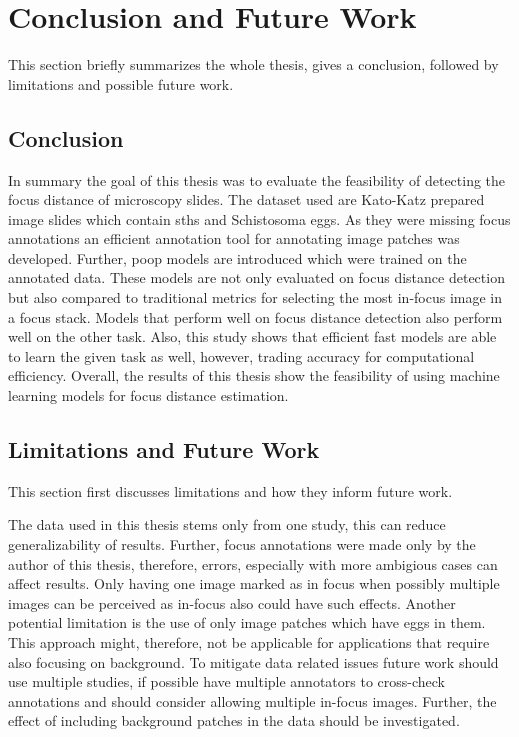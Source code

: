 \chapter{Conclusion and Future Work}
\label{ch:Conclusion}

This section briefly summarizes the whole thesis, gives a conclusion, followed by limitations and possible future work.


\section{Conclusion}
\label{sec:Conclusion:Conclusion}

In summary the goal of this thesis was to evaluate the feasibility of detecting the focus distance of microscopy slides. The dataset used are Kato-Katz prepared image slides which contain \aclp{sth} and Schistosoma eggs. As they were missing focus annotations an efficient annotation tool for annotating image patches was developed. Further, \ac{poop} models are introduced which were trained on the annotated data. These models are not only evaluated on focus distance detection but also compared to traditional metrics for selecting the most in-focus image in a focus stack. Models that perform well on focus distance detection also perform well on the other task. Also, this study shows that efficient fast models are able to learn the given task as well, however, trading accuracy for computational efficiency.
Overall, the results of this thesis show the feasibility of using machine learning models for focus distance estimation.


\section{Limitations and Future Work}
\label{sec:Conclusion:FutureWork}

This section first discusses limitations and how they inform future work.

The data used in this thesis stems only from one study, this can reduce generalizability of results. Further, focus annotations were made only by the author of this thesis, therefore, errors, especially with more ambigious cases can affect results. Only having one image marked as in focus when possibly multiple images can be perceived as in-focus also could have such effects.
Another potential limitation is the use of only image patches which have eggs in them. This approach might, therefore, not be applicable  for applications that require also focusing on background.
To mitigate data related issues future work should use multiple studies, if possible have multiple annotators to cross-check annotations and should consider allowing multiple in-focus images. Further, the effect of including background patches in the data should be investigated.

